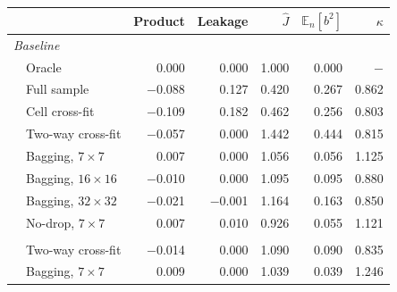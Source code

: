 \begin{tabular}{llrrrrr}
\toprule
 &  & Product & Leakage & $\widehat J$ & $\mathbb{E}_n[b^2]$ & $\kappa$ \\
\midrule
\multicolumn{7}{l}{\emph{Baseline}} \\
 & Oracle & 0.000 & 0.000 & 1.000 & 0.000 & $-$ \\
 & Full sample & $-$0.088 & 0.127 & 0.420 & 0.267 & 0.862 \\
 & Cell cross-fit & $-$0.109 & 0.182 & 0.462 & 0.256 & 0.803 \\
 & Two-way cross-fit & $-$0.057 & 0.000 & 1.442 & 0.444 & 0.815 \\
 & Bagging, $7\times7$ & 0.007 & 0.000 & 1.056 & 0.056 & 1.125 \\
 & Bagging, $16\times16$ & $-$0.010 & 0.000 & 1.095 & 0.095 & 0.880 \\
 & Bagging, $32\times32$ & $-$0.021 & $-$0.001 & 1.164 & 0.163 & 0.850 \\
 & No-drop, $7\times7$ & 0.007 & 0.010 & 0.926 & 0.055 & 1.121 \\
\addlinespace
\multicolumn{7}{l}{\emph{No attributes}} \\
 & Two-way cross-fit & $-$0.014 & 0.000 & 1.090 & 0.090 & 0.835 \\
 & Bagging, $7\times7$ & 0.009 & 0.000 & 1.039 & 0.039 & 1.246 \\
\bottomrule
\end{tabular}
